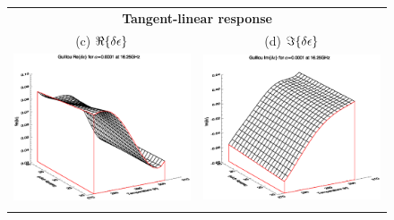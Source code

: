 \begin{figure}[htp]
\begin{tabular}{c c}
    \multicolumn{2}{c}{\sffamily\textbf{Tangent-linear response}}\\
    \textsf{(c)} $\Re\{\delta\epsilon\}$ &
    \textsf{(d)} $\Im\{\delta\epsilon\}$ \\
    \hspace{1.0em}\includegraphics[bb=127 240 508 540,clip,scale=0.5]{graphics/Guillou/FWDTL/TLde_a0.0001_re_16.25GHz.eps} &
    \hspace{1.0em}\includegraphics[bb=127 240 508 540,clip,scale=0.5]{graphics/Guillou/FWDTL/TLde_a0.0001_im_16.25GHz.eps} \\\\

\end{tabular}
\end{figure}

